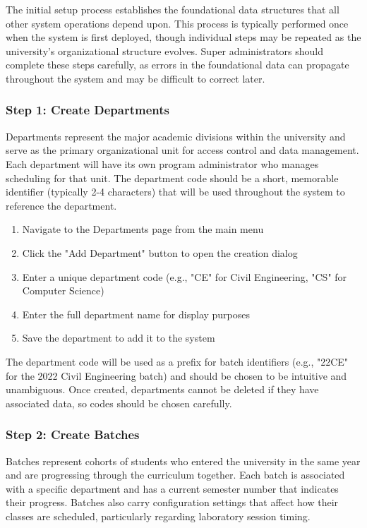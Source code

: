 \documentclass[12pt,a4paper]{article}
\begin{document}
The initial setup process establishes the foundational data structures that all other system operations depend upon. This process is typically performed once when the system is first deployed, though individual steps may be repeated as the university's organizational structure evolves. Super administrators should complete these steps carefully, as errors in the foundational data can propagate throughout the system and may be difficult to correct later.

\subsubsection{Step 1: Create Departments}

Departments represent the major academic divisions within the university and serve as the primary organizational unit for access control and data management. Each department will have its own program administrator who manages scheduling for that unit. The department code should be a short, memorable identifier (typically 2-4 characters) that will be used throughout the system to reference the department.

\begin{enumerate}
    \item Navigate to the Departments page from the main menu
    \item Click the "Add Department" button to open the creation dialog
    \item Enter a unique department code (e.g., "CE" for Civil Engineering, "CS" for Computer Science)
    \item Enter the full department name for display purposes
    \item Save the department to add it to the system
\end{enumerate}

The department code will be used as a prefix for batch identifiers (e.g., "22CE" for the 2022 Civil Engineering batch) and should be chosen to be intuitive and unambiguous. Once created, departments cannot be deleted if they have associated data, so codes should be chosen carefully.

\subsubsection{Step 2: Create Batches}

Batches represent cohorts of students who entered the university in the same year and are progressing through the curriculum together. Each batch is associated with a specific department and has a current semester number that indicates their progress. Batches also carry configuration settings that affect how their classes are scheduled, particularly regarding laboratory session timing.
\end{document}
